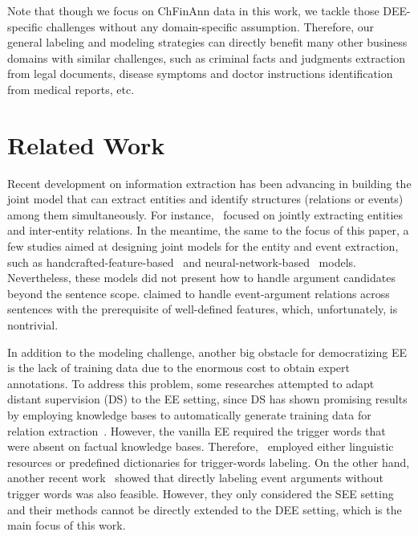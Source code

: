 \documentclass[11pt,a4paper]{article}
\begin{document}
Note that though we focus on ChFinAnn data in this work, we tackle those DEE-specific challenges without any domain-specific assumption.
Therefore, our general labeling and modeling strategies can directly benefit many other business domains with similar challenges, such as criminal facts and judgments extraction from legal documents, disease symptoms and doctor instructions identification from medical reports, etc.




\section{Related Work}

Recent development on information extraction has been advancing in building the joint model that can extract entities and identify structures (relations or events) among them simultaneously.
For instance,~\cite{ren2017cotype,Zheng2017JointEO,zeng2018extracting,wang2018joint} focused on jointly extracting entities and inter-entity relations.
In the meantime, the same to the focus of this paper, a few studies aimed at designing joint models for the entity and event extraction,
such as handcrafted-feature-based~\cite{li2014constructing,yang2016joint,judea2016incremental} and neural-network-based~\cite{zhang2018event,nguyen2019one} models.
Nevertheless, these models did not present how to handle argument candidates beyond the sentence scope.
\cite{yang2016joint} claimed to handle event-argument relations across sentences with the prerequisite of well-defined features, which, unfortunately, is nontrivial.

In addition to the modeling challenge, another big obstacle for democratizing EE is the lack of training data due to the enormous cost to obtain expert annotations.
To address this problem, some researches attempted to adapt distant supervision (DS) to the EE setting, since DS has shown promising results by employing knowledge bases to automatically generate training data for relation extraction~\cite{mintz2009distant}.
However, the vanilla EE required the trigger words that were absent on factual knowledge bases.
Therefore,~\cite{chen2017automatically,yang2018dcfee} employed either linguistic resources or predefined dictionaries for trigger-words labeling.
On the other hand, another recent work~\cite{zeng2018scale} showed that directly labeling event arguments without trigger words was also feasible.
However, they only considered the SEE setting and their methods cannot be directly extended to the DEE setting, which is the main focus of this work.
\end{document}
